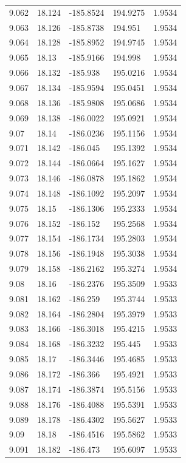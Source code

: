 \begin{tabular}{lllll}
9.062 & 18.124 & -185.8524 & 194.9275 & 1.9534 \\
9.063 & 18.126 & -185.8738 & 194.951 & 1.9534 \\
9.064 & 18.128 & -185.8952 & 194.9745 & 1.9534 \\
9.065 & 18.13 & -185.9166 & 194.998 & 1.9534 \\
9.066 & 18.132 & -185.938 & 195.0216 & 1.9534 \\
9.067 & 18.134 & -185.9594 & 195.0451 & 1.9534 \\
9.068 & 18.136 & -185.9808 & 195.0686 & 1.9534 \\
9.069 & 18.138 & -186.0022 & 195.0921 & 1.9534 \\
9.07 & 18.14 & -186.0236 & 195.1156 & 1.9534 \\
9.071 & 18.142 & -186.045 & 195.1392 & 1.9534 \\
9.072 & 18.144 & -186.0664 & 195.1627 & 1.9534 \\
9.073 & 18.146 & -186.0878 & 195.1862 & 1.9534 \\
9.074 & 18.148 & -186.1092 & 195.2097 & 1.9534 \\
9.075 & 18.15 & -186.1306 & 195.2333 & 1.9534 \\
9.076 & 18.152 & -186.152 & 195.2568 & 1.9534 \\
9.077 & 18.154 & -186.1734 & 195.2803 & 1.9534 \\
9.078 & 18.156 & -186.1948 & 195.3038 & 1.9534 \\
9.079 & 18.158 & -186.2162 & 195.3274 & 1.9534 \\
9.08 & 18.16 & -186.2376 & 195.3509 & 1.9533 \\
9.081 & 18.162 & -186.259 & 195.3744 & 1.9533 \\
9.082 & 18.164 & -186.2804 & 195.3979 & 1.9533 \\
9.083 & 18.166 & -186.3018 & 195.4215 & 1.9533 \\
9.084 & 18.168 & -186.3232 & 195.445 & 1.9533 \\
9.085 & 18.17 & -186.3446 & 195.4685 & 1.9533 \\
9.086 & 18.172 & -186.366 & 195.4921 & 1.9533 \\
9.087 & 18.174 & -186.3874 & 195.5156 & 1.9533 \\
9.088 & 18.176 & -186.4088 & 195.5391 & 1.9533 \\
9.089 & 18.178 & -186.4302 & 195.5627 & 1.9533 \\
9.09 & 18.18 & -186.4516 & 195.5862 & 1.9533 \\
9.091 & 18.182 & -186.473 & 195.6097 & 1.9533 \\

\end{tabular}
